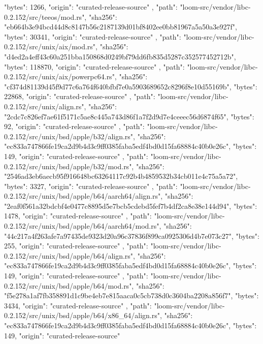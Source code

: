 {{      "bytes": 1266,
      "origin": "curated-release-source"
    },
    {
      "path": "loom-src/vendor/libc-0.2.152/src/teeos/mod.rs",
      "sha256": "eb664b3e94bcd44d8c8147b56c2187139d01bf8402ee0bb81967a5a50a3e927f",
      "bytes": 30341,
      "origin": "curated-release-source"
    },
    {
      "path": "loom-src/vendor/libc-0.2.152/src/unix/aix/mod.rs",
      "sha256": "d4ed2a4eff43c60a251bba150868d0249bf79dd6fb835d5287c352577452712b",
      "bytes": 118870,
      "origin": "curated-release-source"
    },
    {
      "path": "loom-src/vendor/libc-0.2.152/src/unix/aix/powerpc64.rs",
      "sha256": "cf374d81139d45f9d77c6a764f640bfbf7e0a5903689652c8296f8e10d55169b",
      "bytes": 22868,
      "origin": "curated-release-source"
    },
    {
      "path": "loom-src/vendor/libc-0.2.152/src/unix/align.rs",
      "sha256": "2cdc7c826ef7ae61f5171c5ae8c445a743d86f1a7f2d9d7e4ceeec56d6874f65",
      "bytes": 92,
      "origin": "curated-release-source"
    },
    {
      "path": "loom-src/vendor/libc-0.2.152/src/unix/bsd/apple/b32/align.rs",
      "sha256": "ec833a747866fe19ca2d9b4d3c9ff0385faba5edf4bd0d15fa68884c40b0e26c",
      "bytes": 149,
      "origin": "curated-release-source"
    },
    {
      "path": "loom-src/vendor/libc-0.2.152/src/unix/bsd/apple/b32/mod.rs",
      "sha256": "2546ad3eb6aecb95f916648bc63264117c92b4b4859532b34cb011e4c75a5a72",
      "bytes": 3327,
      "origin": "curated-release-source"
    },
    {
      "path": "loom-src/vendor/libc-0.2.152/src/unix/bsd/apple/b64/aarch64/align.rs",
      "sha256": "2eaf0f561a32bdcbf4e0477c8895d5e7bcb5cdebd5fef7b4df2ca8e38e144d94",
      "bytes": 1478,
      "origin": "curated-release-source"
    },
    {
      "path": "loom-src/vendor/libc-0.2.152/src/unix/bsd/apple/b64/aarch64/mod.rs",
      "sha256": "44c217a4f263afe7a97435de9323d20a96c37836f899ca0925306d4b7e073c27",
      "bytes": 255,
      "origin": "curated-release-source"
    },
    {
      "path": "loom-src/vendor/libc-0.2.152/src/unix/bsd/apple/b64/align.rs",
      "sha256": "ec833a747866fe19ca2d9b4d3c9ff0385faba5edf4bd0d15fa68884c40b0e26c",
      "bytes": 149,
      "origin": "curated-release-source"
    },
    {
      "path": "loom-src/vendor/libc-0.2.152/src/unix/bsd/apple/b64/mod.rs",
      "sha256": "f5e278a1af7fb358891d1c9be4eb7e815aaca0c5cb738d0c3604ba2208a856f7",
      "bytes": 3434,
      "origin": "curated-release-source"
    },
    {
      "path": "loom-src/vendor/libc-0.2.152/src/unix/bsd/apple/b64/x86_64/align.rs",
      "sha256": "ec833a747866fe19ca2d9b4d3c9ff0385faba5edf4bd0d15fa68884c40b0e26c",
      "bytes": 149,
      "origin": "curated-release-source"
}}
